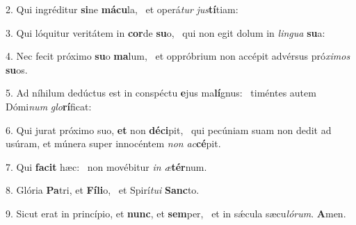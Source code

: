 2. Qui ingréditur \textbf{si}ne \textbf{má}\textbf{cu}la, \ast\  et operá\textit{tur} \textit{jus}\textbf{tí}tiam:\

3. Qui lóquitur veritátem in \textbf{cor}de \textbf{su}o, \ast\  qui non egit dolum in \textit{lin}\textit{gua} \textbf{su}a:\

4. Nec fecit próximo \textbf{su}o \textbf{ma}lum, \ast\  et oppróbrium non accépit advérsus pró\textit{xi}\textit{mos} \textbf{su}os.\

5. Ad níhilum dedúctus est in conspéctu \textbf{e}jus ma\textbf{lí}gnus: \ast\  timéntes autem Dómi\textit{num} \textit{glo}\textbf{rí}ficat:\

6. Qui jurat próximo suo, \textbf{et} non \textbf{dé}\textbf{ci}pit, \ast\  qui pecúniam suam non dedit ad usúram, et múnera super innocéntem \textit{non} \textit{ac}\textbf{cé}pit.\

7. Qui \textbf{fa}\textbf{cit} hæc: \ast\  non movébitur \textit{in} \textit{æ}\textbf{tér}num.\

8. Glória \textbf{Pa}tri, et \textbf{Fí}\textbf{li}o, \ast\  et Spirí\textit{tu}\textit{i} \textbf{Sanc}to.\

9. Sicut erat in princípio, et \textbf{nunc}, et \textbf{sem}per, \ast\  et in sǽcula sæcu\textit{ló}\textit{rum}. \textbf{A}men.\

